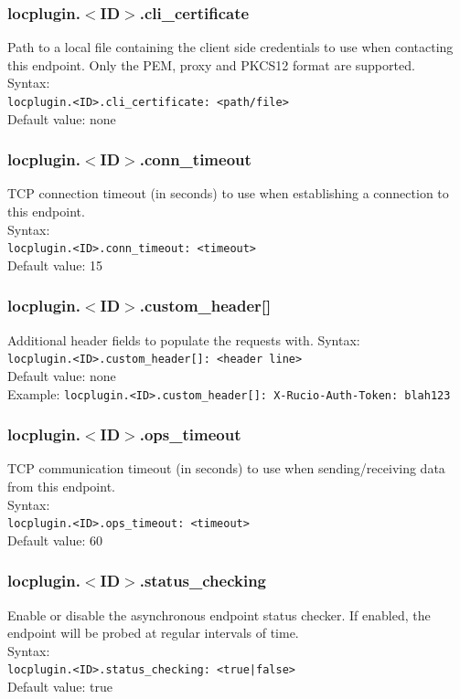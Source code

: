 \documentclass[12pt]{article} %
\begin{document}
\subsubsection{locplugin.$<$ID$>$.cli\_certificate}
Path to a local file containing the client side credentials to use when contacting this endpoint. Only the PEM, proxy and PKCS12 format are supported.\\
Syntax:\\
\lstinline"locplugin.<ID>.cli_certificate: <path/file>"\\
Default value: none\\
\subsubsection{locplugin.$<$ID$>$.conn\_timeout}
TCP connection timeout (in seconds) to use when establishing a connection to this endpoint. \\
Syntax:\\
\lstinline"locplugin.<ID>.conn_timeout: <timeout>"\\
Default value: 15\\
\subsubsection{locplugin.$<$ID$>$.custom\_header[]}
Additional header fields to populate the requests with.
Syntax:\\
\lstinline"locplugin.<ID>.custom_header[]: <header line>"\\
Default value: none\\
Example: \lstinline"locplugin.<ID>.custom_header[]: X-Rucio-Auth-Token: blah123"\\
\subsubsection{locplugin.$<$ID$>$.ops\_timeout}
TCP communication timeout (in seconds) to use when sending/receiving data from this endpoint.\\
Syntax:\\
\lstinline"locplugin.<ID>.ops_timeout: <timeout>"\\
Default value: 60\\
\subsubsection{locplugin.$<$ID$>$.status\_checking}
Enable or disable the asynchronous endpoint status checker. If enabled, the endpoint will be probed at regular intervals of time.\\
Syntax:\\
\lstinline"locplugin.<ID>.status_checking: <true|false>"\\
Default value: true\\
\end{document}
